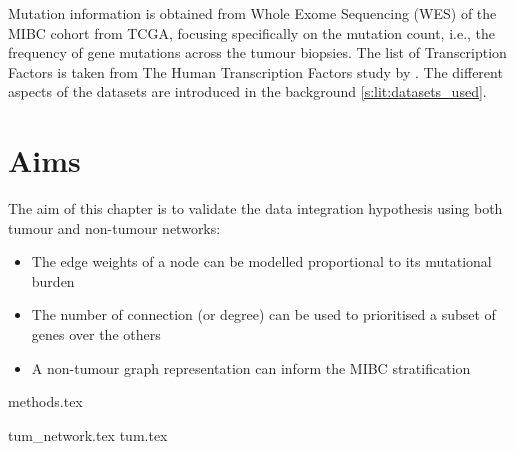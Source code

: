 Mutation information is obtained from Whole Exome Sequencing (WES) of the MIBC cohort from TCGA, focusing specifically on the mutation count, i.e., the frequency of gene mutations across the tumour biopsies. The list of Transcription Factors is taken from The Human Transcription Factors study by \citet{Lambert2018-el}. The different aspects of the datasets are introduced in the background \cref{s:lit:datasets_used}.




\section{Aims}

The aim of this chapter is to validate the data integration hypothesis using both tumour and non-tumour networks:

\begin{itemize}
    \item The edge weights of a node can be modelled proportional to its mutational burden
    \item The number of connection (or degree) can be used to prioritised a subset of genes over the others
    \item A non-tumour graph representation can inform the MIBC stratification 
\end{itemize}


{methods.tex}



{tum_network.tex}
{tum.tex}


